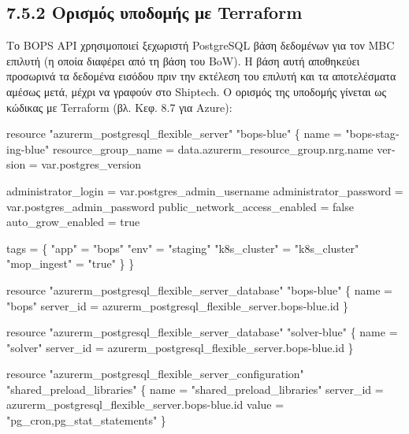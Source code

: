 \documentclass[11pt,a4paper,greek,twoside]{template-xe}
\newenvironment{Shaded}{\begin{english}\begin{snugshade}}{\end{snugshade}\end{english}}
\newcommand{\NormalTok}[1]{#1}
\begin{document}
\subsection{7.5.2 Ορισμός υποδομής με
Terraform}\label{ux3bfux3c1ux3b9ux3c3ux3bcux3ccux3c2-ux3c5ux3c0ux3bfux3b4ux3bfux3bcux3aeux3c2-ux3bcux3b5-terraform}

Το BOPS API χρησιμοποιεί ξεχωριστή PostgreSQL βάση δεδομένων για τον MBC
επιλυτή (η οποία διαφέρει από τη βάση του BoW). Η βάση αυτή αποθηκεύει
προσωρινά τα δεδομένα εισόδου πριν την εκτέλεση του επιλυτή και τα
αποτελέσματα αμέσως μετά, μέχρι να γραφούν στο Shiptech. Ο ορισμός της
υποδομής γίνεται ως κώδικας με Terraform (βλ. Κεφ. 8.7 για Azure):

\begin{Shaded}
\begin{Highlighting}[]
\NormalTok{resource "azurerm\_postgresql\_flexible\_server" "bops{-}blue" \{}
\NormalTok{  name                = "bops{-}staging{-}blue"}
\NormalTok{  resource\_group\_name = data.azurerm\_resource\_group.nrg.name}
\NormalTok{  version             = var.postgres\_version}

\NormalTok{  administrator\_login           = var.postgres\_admin\_username}
\NormalTok{  administrator\_password        = var.postgres\_admin\_password}
\NormalTok{  public\_network\_access\_enabled = false}
\NormalTok{  auto\_grow\_enabled             = true}

\NormalTok{  tags = \{}
\NormalTok{    "app"         = "bops"}
\NormalTok{    "env"         = "staging"}
\NormalTok{    "k8s\_cluster" = "k8s\_cluster"}
\NormalTok{    "mop\_ingest"  = "true"}
\NormalTok{  \}}
\NormalTok{\}}

\NormalTok{resource "azurerm\_postgresql\_flexible\_server\_database" "bops{-}blue" \{}
\NormalTok{  name      = "bops"}
\NormalTok{  server\_id = azurerm\_postgresql\_flexible\_server.bops{-}blue.id}
\NormalTok{\}}

\NormalTok{resource "azurerm\_postgresql\_flexible\_server\_database" "solver{-}blue" \{}
\NormalTok{  name      = "solver"}
\NormalTok{  server\_id = azurerm\_postgresql\_flexible\_server.bops{-}blue.id}
\NormalTok{\}}

\NormalTok{resource "azurerm\_postgresql\_flexible\_server\_configuration" "shared\_preload\_libraries" \{}
\NormalTok{  name      = "shared\_preload\_libraries"}
\NormalTok{  server\_id = azurerm\_postgresql\_flexible\_server.bops{-}blue.id}
\NormalTok{  value     = "pg\_cron,pg\_stat\_statements"}
\NormalTok{\}}
\end{Highlighting}
\end{Shaded}
\end{document}
